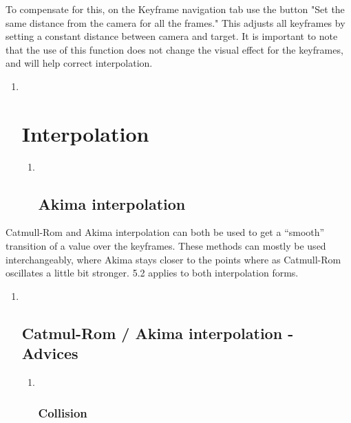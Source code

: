 To compensate for this, on the Keyframe navigation tab use the button
"Set the same distance from the camera for all the frames." This adjusts
all keyframes by setting a constant distance between camera and target.
It is important to note that the use of this function does not change
the visual effect for the keyframes, and will help correct
interpolation.

\begin{enumerate}
\def\labelenumi{\arabic{enumi}.}
\item ~
  \hypertarget{interpolation}{\section{Interpolation}\label{interpolation}}

  \begin{enumerate}
  \def\labelenumii{\arabic{enumii}.}
  \item ~
    \hypertarget{akima-interpolation}{\subsection{Akima
    interpolation}\label{akima-interpolation}}
  \end{enumerate}
\end{enumerate}

Catmull-Rom and Akima interpolation can both be used to get a ``smooth''
transition of a value over the keyframes. These methods can mostly be
used interchangeably, where Akima stays closer to the points where as
Catmull-Rom oscillates a little bit stronger. 5.2 applies to both
interpolation forms.

\begin{enumerate}
\def\labelenumi{\arabic{enumi}.}
\item ~
  \hypertarget{catmul-rom-akima-interpolation---advices}{\subsection{Catmul-Rom
  / Akima interpolation -
  Advices}\label{catmul-rom-akima-interpolation---advices}}

  \begin{enumerate}
  \def\labelenumii{\alph{enumii}.}
  \item ~
    \subsubsection{Collision}\label{collision}
  \end{enumerate}
\end{enumerate}

